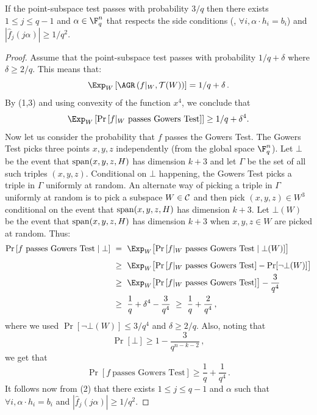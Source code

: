 \begin{lemma} \label{lemma:inner} If the point-subspace test passes with probability
${3}/{q}$ then there exists
$1 \leq j \leq q-1$ and $\alpha\in \F_q^n$ that respects the side conditions (\ie, $\forall i,
\alpha \cdot h_i = b_i$) and $| \widehat{f}_j (j \alpha)| \geq {1}/{q^2}$.
\end{lemma}
\begin{proof} Assume that the point-subspace test passes
with probability ${1}/{q}+\delta$ where $\delta \geq {2}/{q}$. This means that:
  $$ \Exp_W \left[ \AGR\left( f|_W,  {\cal T}(W) \right) \right]  = {1}/{q}+\delta\,. $$
By (1,3) and using convexity of the function $x^4$,
we conclude that
\begin{equation}
\Exp_W \left[\Pr \left[ f|_W \ \mbox{passes Gowers Test} \right] \right] \geq {1}/{q}+\delta^4.
\end{equation}
Now let us consider the probability that $f$ passes the Gowers Test. The Gowers Test
picks three points $x, y, z$ independently (from the global space $\F_q^n$). Let
$\bot$ be the event that  ${\rm span}(x,y,z,H)$ has dimension $k+3$ and
let
$\Gamma$ be the set of all such triples $(x,y,z)$. Conditional on $\bot$ happening,
the Gowers Test picks a triple in $\Gamma$ uniformly at random. An alternate way of
picking a triple in $\Gamma$ uniformly at random is to pick a subspace $W \in {\cal C}$
and then pick $(x,y,z) \in W^3$
conditional on the event that ${\rm span}(x,y,z,H)$ has dimension $k+3$. Let $\bot(W)$
be the event that ${\rm span}(x,y,z,H)$ has dimension $k+3$
when $x,y,z \in W$ are picked at random. Thus:
\begin{align*}
\Pr \left[ \text{$f$ passes Gowers Test} \mid \bot \right]\ &
 =  \ \Exp_W \bigl[ \Pr\left[ f|_W \ \mbox{passes Gowers Test} \mid \bot(W) \right]   \bigr]     \\[1ex]
 & \geq\   \Exp_W \bigl[ \Pr \left[ f|_W \ \mbox{passes Gowers Test}\right] - \Pr[\neg \bot(W)] \bigr] \\
 & \geq\   \Exp_W \bigl[ \Pr \left[ f|_W \ \mbox{passes Gowers Test}\right] \bigr]  - \frac{3}{q^4} \\
 & \geq\   \frac{1}{q} +\delta^4 -\frac{3}{q^4} \ \geq \ \frac{1}{q}+\frac{2}{q^4}\,,
 \end{align*}
where we used $\Pr[ \neg \bot(W)] \leq {3}/{q^4}$ and $\delta \geq {2}/{q}$.
Also, noting that 
\[
\Pr[\bot] \geq 1-\frac{3}{q^{n-k-2}}\,,
\]
we get that
$$\Pr\left[f \ \mbox{passes Gowers Test}\right] \geq \frac{1}{q}+\frac{1}{q^4}\,.$$
It follows now from (2)
that there exists $1 \leq j \leq q-1$ and $\alpha$ such that $\forall i,
\alpha \cdot h_i = b_i$ and $| \widehat{f}_j (j \alpha)| \geq {1}/{q^2}$.
\end{proof}


